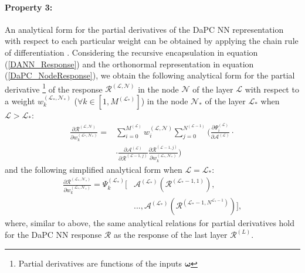 \documentclass[a4paper,fleqn]{article}
\begin{document}
\paragraph{Property 3:}  An analytical form for the partial derivatives of the DaPC NN representation with respect to each particular weight can be obtained by applying the chain rule of differentiation \cite{Goodfellow2016deeplearning}. Considering the recursive encapsulation in equation (\ref{DANN_Response}) and the orthonormal representation in equation (\ref{DaPC_NodeResponse}), we obtain the following analytical form for the partial derivative \footnote{Partial derivatives are functions of the inputs $\bm{\omega}$} of the  response $\mathcal{R}^{(\mathcal{L},\mathcal{N})}$ in the node $\mathcal{N}$ of the layer $\mathcal{L}$ with respect to a weight $w^{(\mathcal{L_*},\mathcal{N_*})}_{k}$ ($\forall k \in [1,M^{(\mathcal{L_*})}]$) in the node $\mathcal{N_*}$ of the layer $\mathcal{L_*}$ when $\mathcal{L}>\mathcal{L_*}$:
%
\begin{equation}
\label{DaPC_derivatives}
\begin{aligned}
\displaystyle \frac{\partial  \mathcal{R}^{(\mathcal{L},\mathcal{N})}}{\partial w^{(\mathcal{L_*},\mathcal{N_*})}_{k}} = &\sum_{i=0}^{M^{(\mathcal{L})}} w^{(\mathcal{L},\mathcal{N})}_{i} 
\sum_{j=0}^{N^{(\mathcal{L}-1)}}
\Bigg(\frac{\partial \Psi^{(\mathcal{L})}_i}{\partial \mathcal{A}^{(\mathcal{L})}}\cdot 
\\
&\cdot \frac{\partial \mathcal{A}^{(\mathcal{L})}}{\partial  \mathcal{R}^{(\mathcal{L}-1,j)}}\frac{\partial \mathcal{R}^{(\mathcal{L}-1,j)}}{\partial w^{(\mathcal{L_*},\mathcal{N_*})}_{k}}\Bigg)
\end{aligned}
\end{equation}
%
and the following simplified analytical form when $\mathcal{L}=\mathcal{L_*}$:
%
%
\begin{equation}
\label{DaPC_derivatives_first}
\begin{aligned}
\displaystyle \frac{\partial  \mathcal{R}^{(\mathcal{L_*},\mathcal{N_*})}}{\partial w^{(\mathcal{L_*},\mathcal{N_*})}_{k}} =   \Psi^{(\mathcal{L_*})}_k\Big[& \mathcal{A}^{(\mathcal{L_*})}(\mathcal{R}^{(\mathcal{L_*}-1,1)}), \\ &...,\mathcal{A}^{(\mathcal{L_*})}(\mathcal{R}^{(\mathcal{L_*}-1,N^{\mathcal{L_*}-1})})
\Big],
\end{aligned}  
\end{equation}
%
where, similar to above, the same analytical relations for partial derivatives hold for the DaPC NN response $\mathcal{R}$ as the response of the last layer  $\bm{\mathcal{R}}^{(L)}$. 
\end{document}
